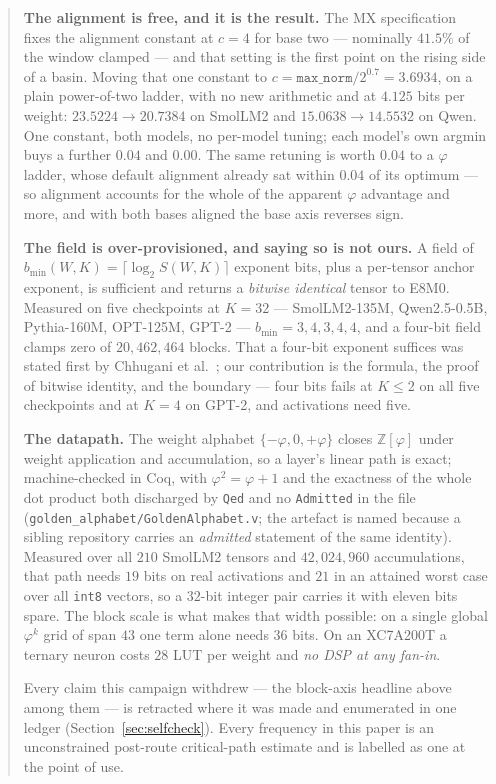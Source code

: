 \documentclass[11pt]{article}
\theoremstyle{definition}
\begin{document}
\begin{abstract}
\textbf{The alignment is free, and it is the result.} The MX
specification~\cite{ocpmx} fixes the alignment constant at $c = 4$ for base two
--- nominally $41.5\%$ of the window clamped --- and that setting is the first
point on the rising side of a basin. Moving that one constant to
$c = \texttt{max\_norm}/2^{0.7} = 3.6934$, on a plain power-of-two ladder, with
no new arithmetic and at $4.125$ bits per weight: $23.5224 \to 20.7384$ on
SmolLM2 and $15.0638 \to 14.5532$ on Qwen. One constant, both models, no
per-model tuning; each model's own argmin buys a further $0.04$ and $0.00$. The
same retuning is worth $0.04$ to a $\varphi$ ladder, whose default alignment
already sat within $0.04$ of its optimum --- so alignment accounts for the
whole of the apparent $\varphi$ advantage and more, and with both bases aligned
the base axis reverses sign.

\textbf{The field is over-provisioned, and saying so is not ours.} A field of
$b_{\min}(W,K) = \lceil \log_{2} S(W,K)\rceil$ exponent bits, plus a per-tensor
anchor exponent, is sufficient and returns a \emph{bitwise identical} tensor to
E8M0. Measured on five checkpoints at $K=32$ --- SmolLM2-135M, Qwen2.5-0.5B,
Pythia-160M, OPT-125M, GPT-2 --- $b_{\min} = 3,4,3,4,4$, and a four-bit field
clamps zero of $20{,}462{,}464$ blocks. That a four-bit exponent suffices was
stated first by Chhugani et al.~\cite{chhugani}; our contribution is the
formula, the proof of bitwise identity, and the boundary --- four bits fails at
$K \leq 2$ on all five checkpoints and at $K = 4$ on GPT-2, and activations
need five.

\textbf{The datapath.} The weight alphabet $\{-\varphi,0,+\varphi\}$ closes
$\mathbb{Z}[\varphi]$ under weight application and accumulation, so a layer's
linear path is exact; machine-checked in Coq, with $\varphi^{2}=\varphi+1$ and
the exactness of the whole dot product both discharged by \texttt{Qed} and no
\texttt{Admitted} in the file (\texttt{golden\_alphabet/GoldenAlphabet.v};
the artefact is named because a sibling repository carries an
\emph{admitted} statement of the same identity). Measured over all $210$
SmolLM2 tensors and $42{,}024{,}960$ accumulations, that path needs $19$ bits
on real activations and $21$ in an attained worst case over all \texttt{int8}
vectors, so a $32$-bit integer pair carries it with eleven bits spare. The
block scale is what makes that width possible: on a single global
$\varphi^{k}$ grid of span $43$ one term alone needs $36$ bits. On an XC7A200T
a ternary neuron costs $28$ LUT per weight and \emph{no DSP at any fan-in}.

Every claim this campaign withdrew --- the block-axis headline above among them
--- is retracted where it was made and enumerated in one ledger
(Section~\ref{sec:selfcheck}). Every frequency in this paper is an
unconstrained post-route critical-path estimate and is labelled as one at the
point of use.
\end{abstract}
\end{document}

